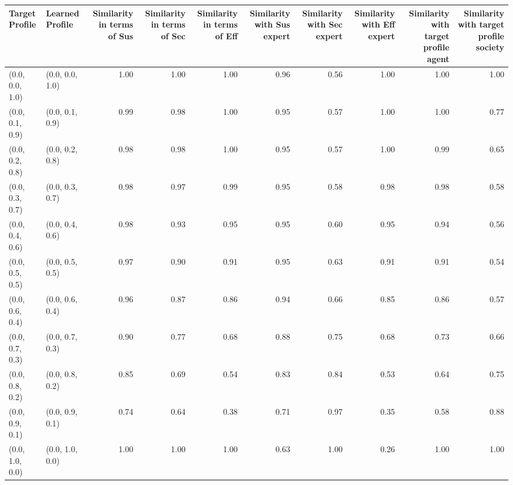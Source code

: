\begin{tabular}{llrrrrrrrr}
\toprule
Target Profile & Learned Profile & Similarity in terms of Sus & Similarity in terms of Sec & Similarity in terms of Eff & Similarity with Sus expert & Similarity with Sec expert & Similarity with Eff expert & Similarity with target profile agent & Similarity with target profile society \\
\midrule
(0.0, 0.0, 1.0) & (0.0, 0.0, 1.0) & 1.00 & 1.00 & 1.00 & 0.96 & 0.56 & 1.00 & 1.00 & 1.00 \\
(0.0, 0.1, 0.9) & (0.0, 0.1, 0.9) & 0.99 & 0.98 & 1.00 & 0.95 & 0.57 & 1.00 & 1.00 & 0.77 \\
(0.0, 0.2, 0.8) & (0.0, 0.2, 0.8) & 0.98 & 0.98 & 1.00 & 0.95 & 0.57 & 1.00 & 0.99 & 0.65 \\
(0.0, 0.3, 0.7) & (0.0, 0.3, 0.7) & 0.98 & 0.97 & 0.99 & 0.95 & 0.58 & 0.98 & 0.98 & 0.58 \\
(0.0, 0.4, 0.6) & (0.0, 0.4, 0.6) & 0.98 & 0.93 & 0.95 & 0.95 & 0.60 & 0.95 & 0.94 & 0.56 \\
(0.0, 0.5, 0.5) & (0.0, 0.5, 0.5) & 0.97 & 0.90 & 0.91 & 0.95 & 0.63 & 0.91 & 0.91 & 0.54 \\
(0.0, 0.6, 0.4) & (0.0, 0.6, 0.4) & 0.96 & 0.87 & 0.86 & 0.94 & 0.66 & 0.85 & 0.86 & 0.57 \\
(0.0, 0.7, 0.3) & (0.0, 0.7, 0.3) & 0.90 & 0.77 & 0.68 & 0.88 & 0.75 & 0.68 & 0.73 & 0.66 \\
(0.0, 0.8, 0.2) & (0.0, 0.8, 0.2) & 0.85 & 0.69 & 0.54 & 0.83 & 0.84 & 0.53 & 0.64 & 0.75 \\
(0.0, 0.9, 0.1) & (0.0, 0.9, 0.1) & 0.74 & 0.64 & 0.38 & 0.71 & 0.97 & 0.35 & 0.58 & 0.88 \\
(0.0, 1.0, 0.0) & (0.0, 1.0, 0.0) & 1.00 & 1.00 & 1.00 & 0.63 & 1.00 & 0.26 & 1.00 & 1.00 \\
\bottomrule
\end{tabular}
